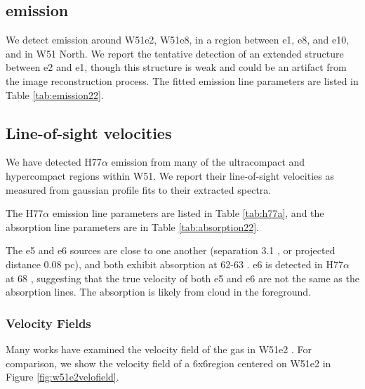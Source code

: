 
\subsection{\formaldehyde \twotwo emission}
\label{sec:twotwoemission}
We detect \formaldehyde \twotwo emission around W51e2, W51e8, in a region
between e1, e8, and e10, and in W51 North.  We report the tentative detection
of an extended structure between e2 and e1, though this structure is weak
and could be an artifact from the image reconstruction process.
The fitted emission line parameters are listed in Table \ref{tab:emission22}.



\subsection{Line-of-sight velocities}
\label{sec:LOSvelo}
We have detected H77$\alpha$ emission from many of the ultracompact and
hypercompact \hii regions within W51.  We report their line-of-sight velocities
as measured from gaussian profile fits to their extracted spectra.

The H77$\alpha$ emission line parameters are listed in Table \ref{tab:h77a}, and
the \para \twotwo absorption line parameters are in Table \ref{tab:absorption22}.

The e5 and e6 sources are close to one another (separation 3.1 \arcsec, or
projected distance 0.08 pc), and both exhibit \formaldehyde absorption at 62-63
\kms.  e6 is detected in H77$\alpha$ at 68 \kms, suggesting that the true
velocity of both e5 and e6 are not the same as the \formaldehyde absorption
lines.  The \formaldehyde absorption is likely from cloud in the foreground.





\subsubsection{Velocity Fields}
Many works have examined the velocity field of the gas in W51e2
\citep{Zhang1997a,Keto2008b,Shi2010a,Shi2010b,Goddi2015b}.  For comparison, we show the
velocity field of a 6x6\arcsec region centered on W51e2 in Figure
\ref{fig:w51e2velofield}.

